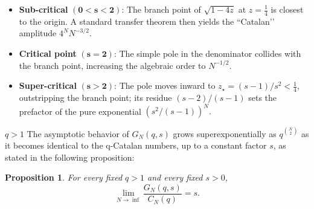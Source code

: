 \documentclass[pdflatex,sn-mathphys-num]{sn-jnl}
\newtheorem{proposition}[theorem]{Proposition}
\theoremstyle{definition}
\theoremstyle{remark}
\numberwithin{equation}{section}
\begin{document}
\begin{itemize}[leftmargin=1.8em]
\item \textbf{Sub-critical} \(\mathbf{(0<s<2)}\):  
  The branch point of \(\sqrt{1-4z}\) at \(z=\tfrac14\) is closest to the
  origin.  A standard transfer theorem then yields the “Catalan’’
  amplitude \(4^{N}N^{-3/2}\).

\item \textbf{Critical point} \(\mathbf{(s=2)}\):  
  The simple pole in the denominator collides with the branch point,
  increasing the algebraic order to \(N^{-1/2}\).

\item \textbf{Super-critical} \(\mathbf{(s>2)}\):  
  The pole moves inward to  
  \(
    z_\star=(s-1)/s^{2}<\tfrac14
  \),
  outstripping the branch point; its residue
  \(
    (s-2)/(s-1)
  \)
  sets the prefactor of the pure exponential
  \(
    (s^{2}/(s-1))^{N}.
  \)
\end{itemize}

\noindent
$\boxed{q > 1}$ The  asymptotic behavior of $G_N(q,s)$ grows superexponentially as $q^{\binom{N}{2}}$
as it becomes identical to the q-Catalan numbers, up to a constant factor $s$, as stated in the following proposition:
\begin{proposition}
\label{prop1}
For every fixed $q>1$ and every fixed $s>0$,
\begin{equation}
\label{eq:Gs-over-Cs}
\lim_{N \to \inf}
\frac{G_{N}(q,s)}{C_{N}(q)} = s.
\end{equation}
\end{proposition}
\end{document}
